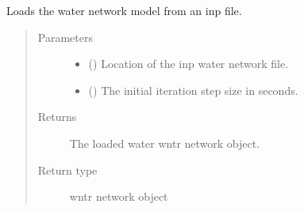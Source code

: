\documentclass[letterpaper,10pt,english]{sphinxmanual}
\begin{document}
\begin{fulllineitems}
\label{\detokenize{apidoc:dreaminsg_integrated_model.src.network_sim_models.water.water_network_model.load_water_network}}
\sphinxAtStartPar
Loads the water network model from an inp file.
\begin{quote}\begin{description}
\item[{Parameters}] \leavevmode\begin{itemize}
\item {} 
\sphinxAtStartPar
{} () \textendash{} Location of the inp water network file.

\item {} 
\sphinxAtStartPar
{} () \textendash{} The initial iteration step size in seconds.

\end{itemize}

\item[{Returns}] \leavevmode
\sphinxAtStartPar
The loaded water wntr network object.

\item[{Return type}] \leavevmode
\sphinxAtStartPar
wntr network object

\end{description}\end{quote}

\end{fulllineitems}

\end{document}
